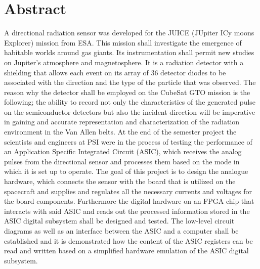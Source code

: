\section{Abstract}
\label{sec:abstract}

A directional radiation sensor was developed for the JUICE (JUpiter ICy moons Explorer) mission from ESA. This mission shall investigate the emergence of habitable worlds around gas giants. Its instrumentation shall permit new studies on Jupiter's atmosphere and magnetosphere.\cite{JUICE}
\newline
It is a radiation detector with a shielding that allows each event on its array of 36 detector diodes to be associated with the direction and the type of the particle that was observed. The reason why the detector shall be employed on the CubeSat GTO mission is the following; the ability to record not only the characteristics of the generated pulse on the semiconductor detectors but also the incident direction will be imperative in gaining and accurate representation and characterization of the radiation environment in the Van Allen belts.
\newline
At the end of the semester project the scientists and engineers at PSI were in the process of testing the performance of an Application Specific Integrated Circuit (ASIC), which receives the analog pulses from the directional sensor and processes them based on the mode in which it is set up to operate. The goal of this project is to design the analogue hardware, which connects the sensor with the board that is utilized on the spacecraft and supplies and regulates all the necessary currents and voltages for the board components. Furthermore the digital hardware on an FPGA chip that interacts with said ASIC and reads out the processed information stored in the ASIC digital subsystem shall be designed and tested. The low-level circuit diagrams as well as an interface between the ASIC and a computer shall be established and it is demonstrated how the content of the ASIC registers can be read and written based on a simplified hardware emulation of the ASIC digital subsystem.
